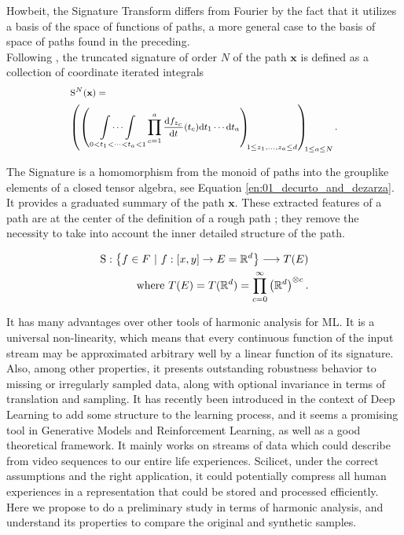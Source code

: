 \documentclass[lettersize,journal]{IEEEtran}
\begin{document}
Howbeit, the Signature Transform differs from Fourier by the fact that it utilizes a basis of the space of functions of paths, a more general case to the basis of space of paths found in the preceding. 
\\

Following \cite{Bonnier2019}, the truncated signature of order $N$ of the path $\mathbf x$ is defined as a collection of coordinate iterated integrals
\begin{align}
& \medmath{\mathrm{S}^{N}(\mathbf x) =} \nonumber \\ & \medmath{\left(\left( \underset{0 < t_1 < \cdots < t_a < 1}{\int\cdots\int} \prod_{c = 1}^a \frac{\mathrm d f_{z_c}}{\mathrm dt}(t_c) \mathrm dt_1 \cdots \mathrm dt_a \right)_{\!\!1 \le z_1, \ldots, z_a \le d}\right)_{\!\!1\le a \le N}.}
\end{align}

The Signature is a homomorphism from the monoid of paths into the grouplike elements of a closed tensor algebra, see Equation \ref{en:01_decurto_and_dezarza}. It provides a graduated summary of the path $\mathbf x$. These extracted features of a path are at the center of the definition of a rough path \cite{Lyons2014}; they remove the necessity to take into account the inner detailed structure of the path.

\begin{align}
\mathrm{S}:\left\{f \in F \ | \ f:[x,y]\to E 
= \mathbb{R}^{d}\right\} \longrightarrow T(E) \\ \textnormal{where } T(E) = T(\mathbb{R}^{d}) =  \prod_{c=0}^{\infty} \left ( \mathbb{R}^{d}\right)^{\otimes c}.
\label{en:01_decurto_and_dezarza}
\end{align}

It has many advantages over other tools of harmonic analysis for ML. It is a universal non-linearity, which means that every continuous function of the input stream may be approximated arbitrary well by a linear function of its signature. Also, among other properties, it presents outstanding robustness behavior to missing or irregularly sampled data, along with optional invariance in terms of translation and sampling. It has recently been introduced in the context of Deep Learning to add some structure to the learning process, and it seems a promising tool in Generative Models and Reinforcement Learning, as well as a good theoretical framework. It mainly works on streams of data which could describe from video sequences to our entire life experiences. Scilicet, under the correct assumptions and the right application, it could potentially compress all human experiences in a representation that could be stored and processed efficiently. Here we propose to do a preliminary study in terms of harmonic analysis, and understand its properties to compare the original and synthetic samples.
\end{document}

